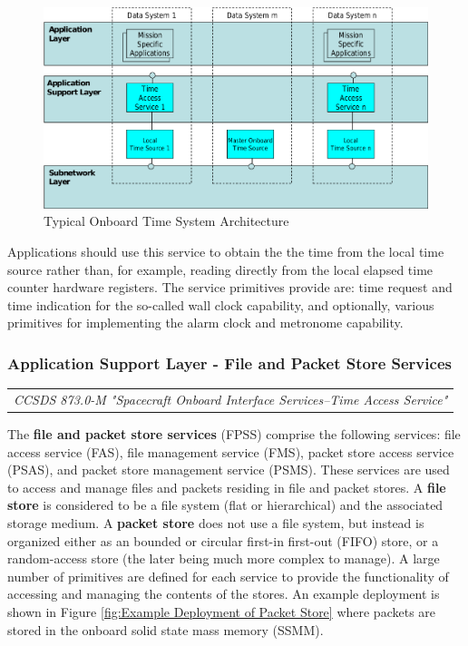 \begin{figure}[h]
\centering\includegraphics[scale=0.3]{fig/typical_onboard_time_system_architecture}
\caption{Typical Onboard Time System Architecture}
\label{fig:Typical Onboard Time System Architecture}
\end{figure}

Applications should use this service to obtain the the time from the local time source rather than, for example, reading directly from the local elapsed time counter hardware registers. The service primitives provide are: time request and time indication for the so-called wall clock capability, and optionally, various primitives for implementing the alarm clock and metronome capability. 

\subsubsection{Application Support Layer - File and Packet Store Services}

\begin{tabular}{l}
\textit{CCSDS 873.0-M "Spacecraft Onboard Interface Services--Time Access Service" \cite{}} 
\end{tabular}

The \textbf{file and packet store services} (FPSS) comprise the following services: file access service (FAS), file management service (FMS), packet store access service (PSAS), and packet store management service (PSMS). These services are used to access and manage files and packets residing in file and packet stores. A \textbf{file store} is considered to be a file system (flat or hierarchical) and the associated storage medium. A \textbf{packet store} does not use a file system, but instead is organized either as an bounded or circular first-in first-out (FIFO) store, or a random-access store (the later being much more complex to manage). A large number of primitives are defined for each service to provide the functionality of accessing and managing the contents of the stores. An example deployment is shown in Figure \ref{fig:Example Deployment of Packet Store} where packets are stored in the onboard solid state mass memory (SSMM).

